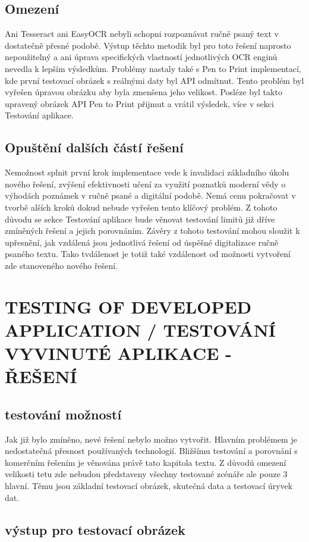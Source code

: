 \documentclass[journal]{IEEEtran}
\begin{document}
\subsection{Omezení}
Ani Tesseract ani EasyOCR nebyli schopni rozpoznávat ručně psaný text v dostatečně přesné podobě.
Výstup těchto metodik byl pro toto řešení naprosto nepoužitelný a ani úprava specifických vlastností jednotlivých \ac{OCR} enginů nevedla k lepším výsledkům.
Problémy nastaly také s Pen to Print implementací, kde první testovací obrázek s reálnými daty byl  \ac{API} odmítnut.
Tento problém byl vyřešen úpravou obrázku aby byla zmenšena jeho velikost.
Posléze byl takto upravený obrázek \ac{API} Pen to Print přijmut a vrátil výsledek, více v sekci Testování aplikace.

\subsection{Opuštění dalších částí řešení}
Nemožnost splnit první krok implementace vede k invalidaci základního úkolu nového řešení, zvýšení efektivnosti učení za využití poznatků moderní vědy o výhodách poznámek v ručně psané a digitální podobě.
Nemá cenu pokračovat v tvorbě alších kroků dokud nebude vyřešen tento klíčový problém.
Z tohoto důvodu se  sekce Testování aplikace bude věnovat testování limitů již dříve zmíněných řešení a jejich porovnáním.
Závěry z tohoto testování mohou sloužit k upřesnění, jak vzdálená jsou jednotlivá řešení od úspěšné digitalizace ručně psaného textu.
Tako tvdálenost je totiž také vzdálenost od možnosti vytvoření zde stanoveného nového řešení.


\section{TESTING OF DEVELOPED APPLICATION / TESTOVÁNÍ VYVINUTÉ APLIKACE - ŘEŠENÍ}

\subsection{testování možností}
Jak již bylo zmíněno, nevé řešení nebylo možno vytvořit.
Hlavním problémem je nedostatečná přesnost používaných technologií.
Bližšímu testování a porovnání s komerčním řešením je věnována právě tato kapitola textu.
Z důvodů omezení velikosti tetu zde nebudou představeny všechny testované zcénáře ale pouze 3 hlavní.
Těmu jsou základní testovací obrázek, skutečná data a testovací úryvek dat.

\subsection{výstup pro testovací obrázek}
\end{document}
